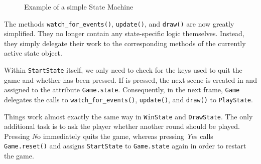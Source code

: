 \begin{figure}[htb]
	\caption{Example of a simple State Machine}\label{picStateMachine01}
\end{figure}

The methods \texttt{watch\_for\_events()}, \texttt{update()}, and \texttt{draw()} are now greatly simplified. They no longer contain any state-specific logic themselves. Instead, they simply delegate their work to the corresponding methods of the currently active state object.


Within \texttt{StartState} itself, we only need to check for the keys used to quit the game and whether  has been pressed. If  is pressed, the next scene is created in  and assigned to the attribute \texttt{Game.state}. Consequently, in the next frame, \texttt{Game} delegates the calls to \texttt{watch\_for\_events()}, \texttt{update()}, and \texttt{draw()} to \texttt{PlayState}.


Things work almost exactly the same way in \texttt{WinState} and \texttt{DrawState}. The only additional task is to ask the player whether another round should be played. Pressing \emph{N}o immediately quits the game, whereas pressing \emph{Y}es calls \texttt{Game.reset()} and assigns \texttt{StartState} to \texttt{Game.state} again in order to restart the game.


